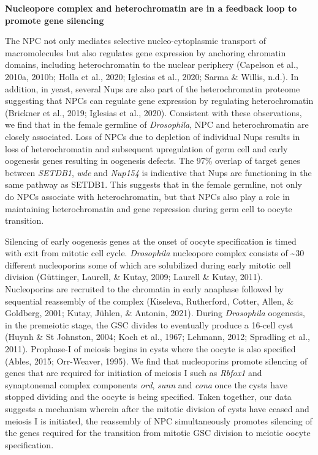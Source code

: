 \documentclass[12pt,oneside]{reedthesis}
\begin{document}
\textbf{Nucleopore complex and heterochromatin are in a feedback loop to
promote gene silencing}

The NPC not only mediates selective nucleo-cytoplasmic transport of
macromolecules but also regulates gene expression by anchoring chromatin
domains, including heterochromatin to the nuclear periphery
(Capelson et al., 2010a, 2010b; Holla et al., 2020; Iglesias et al., 2020; Sarma \& Willis, n.d.). In addition, in yeast, several
Nups are also part of the heterochromatin proteome suggesting that NPCs
can regulate gene expression by regulating heterochromatin
(Brickner et al., 2019; Iglesias et al., 2020). Consistent with these
observations, we find that in the female germline of \emph{Drosophila}, NPC
and heterochromatin are closely associated. Loss of NPCs due to
depletion of individual Nups results in loss of heterochromatin and
subsequent upregulation of germ cell and early oogenesis genes resulting
in oogenesis defects. The 97\% overlap of target genes between \emph{SETDB1},
\emph{wde} and \emph{Nup154} is indicative that Nups are functioning in the same
pathway as SETDB1. This suggests that in the female germline, not only
do NPCs associate with heterochromatin, but that NPCs also play a role
in maintaining heterochromatin and gene repression during germ cell to
oocyte transition.

Silencing of early oogenesis genes at the onset of oocyte specification
is timed with exit from mitotic cell cycle. \emph{Drosophila} nucleopore
complex consists of \textasciitilde30 different nucleoporins some of which are
solubilized during early mitotic cell division
(Güttinger, Laurell, \& Kutay, 2009; Laurell \& Kutay, 2011). Nucleoporins are recruited to
the chromatin in early anaphase followed by sequential reassembly of the
complex (Kiseleva, Rutherford, Cotter, Allen, \& Goldberg, 2001; Kutay, Jühlen, \& Antonin, 2021). During \emph{Drosophila}
oogenesis, in the premeiotic stage, the GSC divides to eventually
produce a 16-cell cyst (Huynh \& St Johnston, 2004; Koch et al., 1967; Lehmann, 2012; Spradling et al., 2011).
Prophase-I of meiosis begins in cysts where the oocyte is also specified
(Ables, 2015; Orr-Weaver, 1995). We find that nucleoporins
promote silencing of genes that are required for initiation of meiosis I
such as \emph{Rbfox1} and synaptonemal complex components \emph{ord}, \emph{sunn} and
\emph{cona} once the cysts have stopped dividing and the oocyte is being
specified. Taken together, our data suggests a mechanism wherein after
the mitotic division of cysts have ceased and meiosis I is initiated,
the reassembly of NPC simultaneously promotes silencing of the genes
required for the transition from mitotic GSC division to meiotic oocyte
specification.
\end{document}
